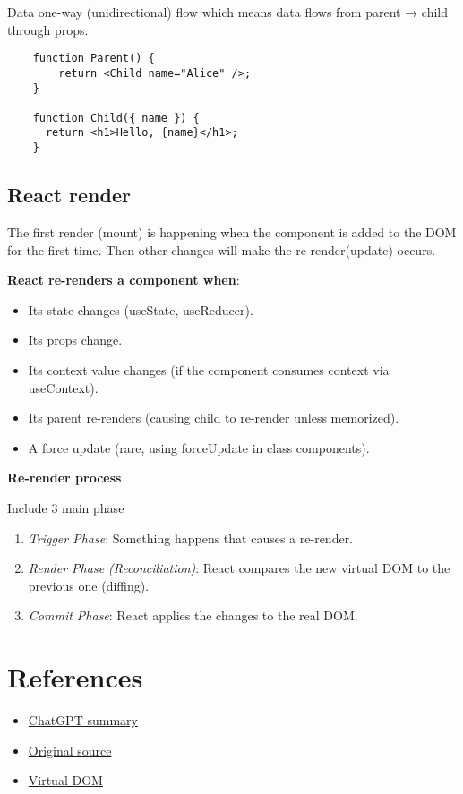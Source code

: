 \documentclass[13pt]{article}
\begin{document}
Data one-way (unidirectional) flow which means data flows from parent → child through props.

\begin{verbatim}
    function Parent() {
        return <Child name="Alice" />;
    }

    function Child({ name }) {
      return <h1>Hello, {name}</h1>;
    }
\end{verbatim}

\subsection{React render}
The first render (mount) is happening when the component is added to the DOM for the first time. Then other changes will make the  re-render(update) occurs.

\textbf{React re-renders a component when}:
\begin{itemize}
    \item Its state changes (useState, useReducer).
    \item Its props change.
    \item Its context value changes (if the component consumes context via useContext).
    \item Its parent re-renders (causing child to re-render unless memorized).
    \item A force update (rare, using forceUpdate in class components).
\end{itemize}

\textbf{Re-render process}

Include 3 main phase
\begin{enumerate}
    \item \textit{Trigger Phase}: Something happens that causes a re-render.
    \item \textit{Render Phase (Reconciliation)}: React compares the new virtual DOM to the previous one (diffing).
    \item \textit{Commit Phase}: React applies the changes to the real DOM.
\end{enumerate}

\section{References}
\begin{itemize}
    \item \href{https://chatgpt.com/c/681e3979-1fe4-8007-9c35-20871b70514a}{ChatGPT summary}

    \item \href{https://react.dev/learn/describing-the-ui}{Original source}

    \item \href{https://legacy.reactjs.org/docs/faq-internals.html#:~:text=The%20virtual%20DOM%20,This%20process%20is%20called%20reconciliation}{Virtual DOM}
\end{itemize}
\end{document}
